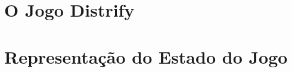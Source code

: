 \documentclass[a4paper]{article}
\begin{document}

\newpage

%
%
%
%
%
%
%


\section{O Jogo Distrify}



\newpage
\section{Representação do Estado do Jogo}

\end{document}
